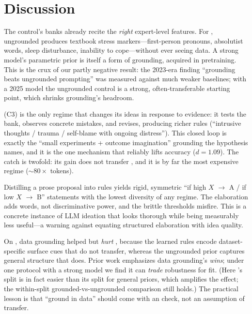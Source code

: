 \section{Discussion}
\label{sec:discussion}

 The control's banks already recite the
\emph{right} expert-level features. For \dreaddit, \gptmini{} ungrounded produces
textbook stress markers---first-person pronouns, absolutist words, sleep disturbance,
inability to cope---without ever seeing data. A strong model's parametric prior is
itself a form of grounding, acquired in pretraining. This is the crux of our partly
negative result: the 2023-era finding ``grounding beats ungrounded prompting'' was
measured against much weaker baselines; with a 2025 model the ungrounded control is a
strong, often-transferable starting point, which shrinks grounding's headroom.

 \Cempirical{} (C3) is the only
regime that changes its ideas in response to evidence: it tests the bank, observes
concrete mistakes, and revises, producing richer rules (\eg ``intrusive thoughts /
trauma / self-blame with ongoing distress''). This closed loop is exactly the ``small
experiments + outcome imagination'' grounding the hypothesis names, and it is the one
mechanism that reliably lifts \IND{} accuracy ($d{=}1.09$). The catch is twofold: its
\IND{} gain does not transfer \OOD, and it is by far the most expensive regime
($\sim\!80\times$ tokens).

 Distilling a prose proposal into rules yields
rigid, symmetric ``if high $X$ $\rightarrow$ A / if low $X$ $\rightarrow$ B''
statements with the lowest diversity of any regime. The elaboration adds words, not
discriminative power, and the brittle thresholds misfire. This is a concrete instance
of LLM ideation that looks thorough while being measurably less useful---a warning
against equating structured elaboration with idea quality.

 On \deceptive, data grounding helped \IND{} but
\emph{hurt} \OOD, because the learned rules encode dataset-specific surface cues that
do not transfer, whereas the ungrounded prior captures general structure that does.
Prior work emphasizes data grounding's \OOD{} \emph{wins}; under one protocol with a
strong model we find it can \emph{trade} \OOD{} robustness for \IND{} fit. (Here
\deceptive's \OOD{} split is in fact easier than its \IND{} split for general priors,
which amplifies the effect; the within-split grounded-vs-ungrounded comparison still
holds.) The practical lesson is that ``ground in data'' should come with an
\OOD{} check, not an assumption of transfer.

